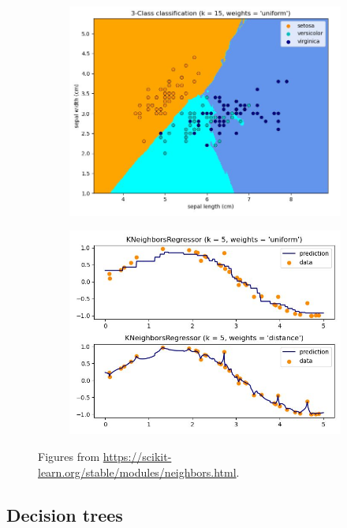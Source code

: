 \begin{figure}[ht]
	\centering
	\begin{subfigure}{.5\textwidth}
		\centering
		\includegraphics[width=1\linewidth]{figure_ml/nn.png}
	\end{subfigure}%
	\begin{subfigure}{.5\textwidth}
		\centering
		\includegraphics[width=1\linewidth]{figure_ml/nn2.png}
	\end{subfigure}
	\caption{
		Figures from \url{https://scikit-learn.org/stable/modules/neighbors.html}.
	}
\end{figure}


\subsection{Decision trees}

